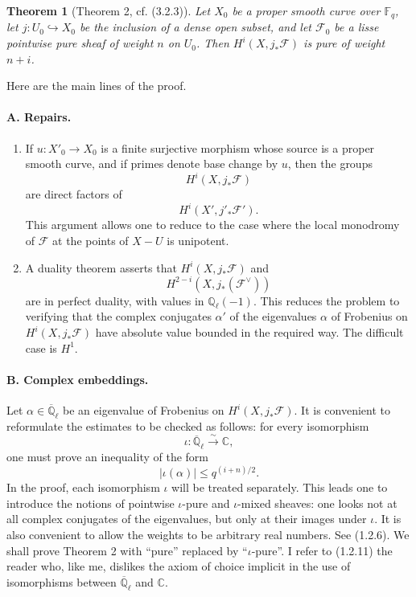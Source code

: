 \documentclass[11pt]{article}
\newtheorem{theorem}{Theorem}
\theoremstyle{remark}
\newcommand{\Ql}{\mathbb{Q}_\ell}
\newcommand{\CC}{\mathbb{C}}
\newcommand{\Fq}{\mathbb{F}_q}
\newcommand{\Abar}{\overline{\mathbb{Q}}_\ell}
\begin{document}
\begin{theorem}[Theorem 2, cf. (3.2.3)]
Let $X_0$ be a proper smooth curve over $\Fq$, let $j:U_0\hookrightarrow X_0$ be the inclusion of a dense open subset, and let $\mathcal F_0$ be a lisse pointwise pure sheaf of weight $n$ on $U_0$. Then $H^i(X,j_{*}\mathcal F)$ is pure of weight $n+i$.
\end{theorem}

Here are the main lines of the proof.

\paragraph{A. Repairs.}
\begin{enumerate}[label=(\roman*)]
\item If $u:X'_0\to X_0$ is a finite surjective morphism whose source is a proper smooth curve, and if primes denote base change by $u$, then the groups
\[
H^i(X,j_{*}\mathcal F)
\]
are direct factors of
\[
H^i(X',j'_*\mathcal F').
\]
This argument allows one to reduce to the case where the local monodromy of $\mathcal F$ at the points of $X-U$ is unipotent.
\item A duality theorem asserts that $H^i(X,j_{*}\mathcal F)$ and
\[
H^{2-i}(X,j_{*}(\mathcal F^\vee))
\]
are in perfect duality, with values in $\Ql(-1)$. This reduces the problem to verifying that the complex conjugates $\alpha'$ of the eigenvalues $\alpha$ of Frobenius on $H^i(X,j_{*}\mathcal F)$ have absolute value bounded in the required way. The difficult case is $H^1$.
\end{enumerate}

\paragraph{B. Complex embeddings.}
Let $\alpha\in \Abar$ be an eigenvalue of Frobenius on $H^i(X,j_{*}\mathcal F)$. It is convenient to reformulate the estimates to be checked as follows: for every isomorphism
\[
\iota:\Abar\xrightarrow{\sim}\CC,
\]
one must prove an inequality of the form
\[
|\iota(\alpha)|\le q^{(i+n)/2}.
\]
In the proof, each isomorphism $\iota$ will be treated separately. This leads one to introduce the notions of pointwise $\iota$-pure and $\iota$-mixed sheaves: one looks not at all complex conjugates of the eigenvalues, but only at their images under $\iota$. It is also convenient to allow the weights to be arbitrary real numbers. See (1.2.6). We shall prove Theorem 2 with ``pure'' replaced by ``$\iota$-pure''. I refer to (1.2.11) the reader who, like me, dislikes the axiom of choice implicit in the use of isomorphisms between $\Abar$ and $\CC$.
\end{document}
